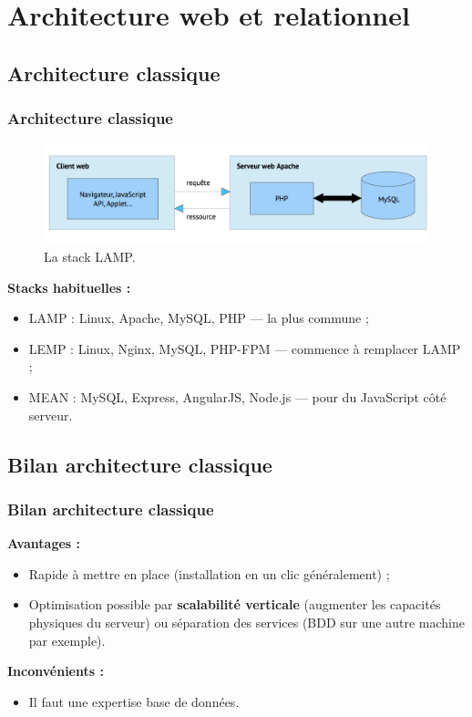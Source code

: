 \section{Architecture web et relationnel}

	\subsection{Architecture classique}
	\begin{frame}
		\frametitle{Architecture classique}

		\begin{figure}[htb]
			\includegraphics[width=1\textwidth]{images/LAMP.png}
			\caption{La stack LAMP.}
		\end{figure}

		\textbf{Stacks habituelles :}
		\begin{itemize}
			\item LAMP : Linux, Apache, MySQL, PHP — la plus commune ;
			\item LEMP : Linux, Nginx, MySQL, PHP-FPM — commence à remplacer LAMP ;
			\item MEAN : MySQL, Express, AngularJS, Node.js — pour du JavaScript côté serveur.
		\end{itemize}
	\end{frame}

	\subsection{Bilan architecture classique}
	\begin{frame}
		\frametitle{Bilan architecture classique}

		\textbf{Avantages :}
		\begin{itemize}
			\item Rapide à mettre en place (installation en un clic généralement) ;
			\item Optimisation possible par \textbf{scalabilité verticale} (augmenter les capacités physiques du serveur) ou séparation des services (BDD sur une autre machine par exemple).
		\end{itemize}

		\vspace{20px}

		\textbf{Inconvénients :}
		\begin{itemize}
			\item Il faut une expertise base de données.
		\end{itemize}
	\end{frame}

